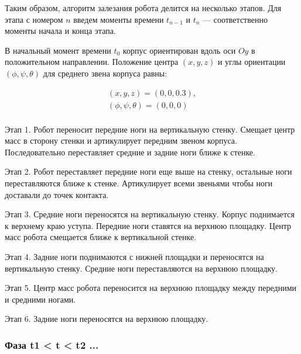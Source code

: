Таким образом, алгоритм залезания робота делится на несколько этапов. Для этапа с номером $n$ введем моменты времени $t_{n-1}$ и $t_n$ --- соответственно моменты начала и конца этапа.

В начальный момент времени $t_0$ корпус ориентирован вдоль оси $Oy$ в положительном направлении. Положение центра $(x,y,z)$ и углы ориентации $(\phi,\psi,\theta)$ для среднего звена корпуса равны:

\begin{equation}
  \begin{alignedat}{2}
    (x,y,z) = (0,0,0.3),\\
    (\phi,\psi,\theta) = (0,0,0)\\
  \end{alignedat}
\end{equation}


Этап 1. Робот переносит передние ноги на вертикальную стенку. Смещает центр масс в сторону стенки и артикулирует передним звеном корпуса. Последовательно переставляет средние и задние ноги ближе к стенке.

Этап 2. Робот переставляет передние ноги еще выше на стенку, остальные ноги переставляются ближе к стенке. Артикулирует всеми звеньями чтобы ноги доставали до точек контакта.

Этап 3. Средние ноги переносятся на вертикальную стенку. Корпус поднимается к верхнему краю уступа. Передние ноги ставятся на верхнюю площадку. Центр масс робота смещается ближе к вертикальной стенке.

Этап 4. Задние ноги поднимаются с нижней площадки и переносятся на вертикальную стенку. Средние ноги переставляются на верхнюю площадку.

Этап 5. Центр масс робота переносится на верхнюю площадку между передними и средними ногами.

Этап 6. Задние ноги переносятся на верхнюю площадку.





\subsubsection{Фаза t1 < t < t2 ...}



